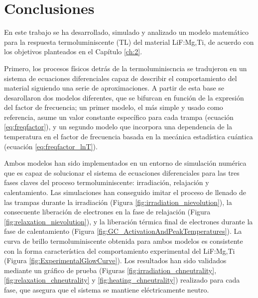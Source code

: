 \chapter*{Conclusiones}

En este trabajo se ha desarrollado, simulado y analizado un modelo matemático para la respuesta termoluminiscente (TL) del material LiF:Mg,Ti, de acuerdo con los objetivos planteados en el Capítulo \ref{ch:2}.

\vspace{10pt}

Primero, los procesos físicos detrás de la termoluminiscncia se tradujeron en un sistema de ecuaciones diferenciales capaz de describir el comportamiento del material siguiendo una serie de aproximaciones. A partir de esta base se desarollaron dos modelos diferentes, que se bifurcan en función de la expresión del factor de frecuencia; un primer modelo, el más simple y usado como referencia, asume un valor constante específico para cada trampa (ecuación \ref{eq:freqfactor}), y un segundo modelo que incorpora una dependencia de la temperatura en el factor de frecuencia basada en la mecánica estadística cuántica (ecuación \ref{eq:freqfactor_lnT}).

\vspace{10pt}

Ambos modelos han sido implementados en un entorno de simulación numérica que es capaz de solucionar el sistema de ecuaciones diferenciales para las tres fases claves del proceso termoluminiscente: irradiación, relajación y calentamiento. Las simulaciones han conseguido imitar el proceso de llenado de las trampas durante la irradiación (Figura \ref{fig:irradiation_nievolution}), la consecuente liberación de electrones en la fase de relajación (Figura \ref{fig:relaxation_nievolution}), y la liberación térmica final de electrones durante la fase de calentamiento (Figura \ref{fig:GC_ActivationAndPeakTemperatures}). La curva de brillo termoluminiscente obtenida para ambos modelos es consistente con la forma característica del comportamiento experimental del LiF:Mg,Ti (Figura \ref{fig:ExperimentalGlowCurve}). Los resultados han sido validados mediante un gráfico de prueba (Figuras \ref{fig:irradiation_chneutrality}, \ref{fig:relaxation_chneutrality} y \ref{fig:heating_chneutrality}) realizado para cada fase, que asegura que el sistema se mantiene eléctricamente neutro.

\vspace{10pt}

